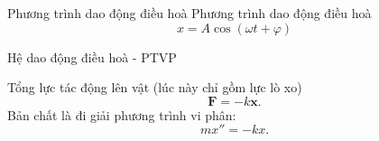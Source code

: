 \begin{frame}{Phương trình dao động điều hoà}
    Phương trình dao động điều hoà
    \begin{equation}
        x = A \cos{(\omega t +\varphi)}
    \end{equation}
    \vspace{5mm}
    
    \begin{center}
        \resizebox{0.7\linewidth}{!}{}
    \end{center}
\end{frame}

\begin{frame}{Hệ dao động điều hoà - PTVP}
    \begin{center}
        
    \end{center}
    Tổng lực tác động lên vật (lúc này chỉ gồm lực lò xo)
    \begin{equation*}
        \mathbf{F} = - k \mathbf{x}.
    \end{equation*}
    \pause
    Bản chất là đi giải phương trình vi phân:
    \begin{equation}
        m x'' = - k x.
    \end{equation}
\end{frame}
